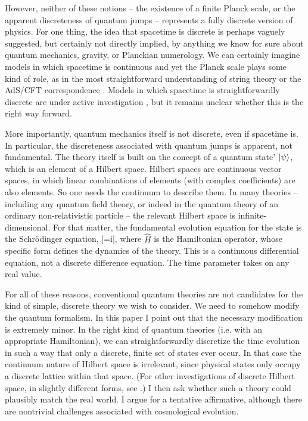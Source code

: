 \documentclass[aps,prd,twocolumn,nofootinbib,notitlepage]{revtex4-1}
\begin{document}
However, neither of these notions -- the existence of a finite Planck scale, or the apparent discreteness of quantum jumps -- represents a fully discrete version of physics.
For one thing, the idea that spacetime is discrete is perhaps vaguely suggested, but certainly not directly implied, by anything we know for sure about quantum mechanics, gravity, or Planckian numerology.
We can certainly imagine models in which spacetime is continuous and yet the Planck scale plays some kind of role, as in the most straightforward understanding of string theory or the AdS/CFT correspondence \cite{Maldacena:1997re}. 
Models in which spacetime is straightforwardly discrete are under active investigation \cite{Surya_2019}, but it remains unclear whether this is the right way forward.

More importantly, quantum mechanics itself is not discrete, even if spacetime is.
In particular, the discreteness associated with quantum jumps is apparent, not fundamental.
The theory itself is built on the concept of a quantum state' $\lvert \psi\rangle$, which is an element of a Hilbert space.
Hilbert spaces are continuous vector spaces, in which linear combinations of elements (with complex coefficients) are also elements.
So one needs the continuum to describe them.
In many theories -- including any quantum field theory, or indeed in the quantum theory of an ordinary non-relativistic particle -- the relevant Hilbert space is infinite-dimensional.
For that matter, the fundamental evolution equation for the state is the Schr\"odinger equation,
\be
{}\left|\psi\right\rangle=i\left|\psi\right\rangle,
\label{schr}
\ee
where $\hat{H}$ is the Hamiltonian operator, whose specific form defines the dynamics of the theory.
This is a continuous differential equation, not a discrete difference equation.
The time parameter takes on any real value.

For all of these reasons, conventional quantum theories are not candidates for the kind of simple, discrete theory we wish to consider.
We need to somehow modify the quantum formalism.
In this paper I point out that the necessary modification is extremely minor.
In the right kind of quantum theories (i.e. with an appropriate Hamiltonian), we can straightforwardly discretize the time evolution in such a way that only a discrete, finite set of states ever occur.
In that case the continuum nature of Hilbert space is irrelevant, since physical states only occupy a discrete lattice within that space.
(For other investigations of discrete Hilbert space, in slightly different forms, see \cite{Buniy2005,Palmer2022}.)
I then ask whether such a theory could plausibly match the real world.
I argue for a tentative affirmative, although there are nontrivial challenges associated with cosmological evolution.
\end{document}
